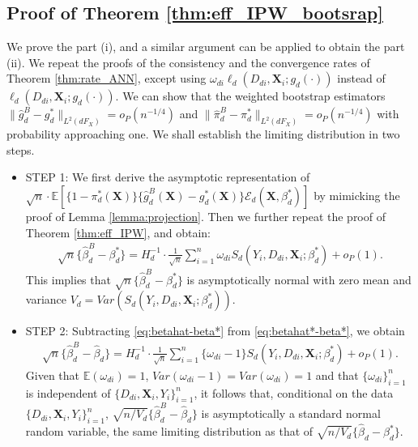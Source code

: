 \documentclass[11pt]{article}
\numberwithin{equation}{section}
\begin{document}
\subsection{Proof of Theorem \ref{thm:eff_IPW_bootsrap}}
We prove the part (i), and a similar argument can be applied to obtain the part (ii). We repeat the proofs of the consistency
and the convergence rates of Theorem \ref{thm:rate_ANN}, except using $\omega_{di}\ell_d(D_{di},\boldsymbol{X}_{i};g_d(\cdot))$
instead of $\ell_d(D_{di},\boldsymbol{X}_{i};g_d(\cdot))$. We can show that
the weighted bootstrap estimators $\|\widehat{g}^{B}_d-{g}_d^*\|_{L^2(dF_X)}=o_P(n^{-1/4})$ and $\|\widehat{\pi}^{B}_d-{\pi}_d^*\|_{L^2(dF_X)}=o_P(n^{-1/4})$   with probability approaching one. We shall establish the limiting
distribution in two steps.
\begin{itemize}
	\item STEP 1: We first derive the asymptotic representation of $\sqrt{n}\cdot\mathbb{E}[\{1-\pi_d^*(\boldsymbol{X})\}\{\widehat{g}^{B}_d(\boldsymbol{X})-g_d^*(\boldsymbol{X})\}\mathcal{E}_d(\boldsymbol{X},\beta_d^*)]$ by mimicking the proof of Lemma \ref{lemma:projection}. Then we further repeat the proof of Theorem \ref{thm:eff_IPW}, and obtain:
	\begin{align}\label{eq:betahat*-beta*}
		\sqrt{n}\{\widehat{\beta}^{B}_{d}-\beta^*_{d}\}=H_d^{-1}\cdot \frac{1}{\sqrt{n}}\sum_{i=1}^n\omega_{di}S_{d}(Y_i,D_{di},\boldsymbol{X}_{i};\beta_d^*)+o_P(1).
	\end{align}
	This implies that $\sqrt{n}\{\widehat{\beta}^{B}_{d}-\beta^*_{d}\}$ is asymptotically
	normal with zero mean and variance $V_d=Var(S_{d}(Y_i,D_{di},\boldsymbol{X}_{i};\beta_d^*))$.
	\item STEP 2: Subtracting \eqref{eq:betahat-beta*} from \eqref{eq:betahat*-beta*}, we obtain
	\begin{align*}
		\sqrt{n}\{\widehat{\beta}^{B}_{d}-\widehat{\beta}_{d}\}=H_d^{-1}\cdot \frac{1}{\sqrt{n}}\sum_{i=1}^n\{\omega_{di}-1\}S_{d}(Y_i,D_{di},\boldsymbol{X}_{i};\beta_d^*)+o_P(1).
	\end{align*}
	Given that $\mathbb{E}(\omega_{di})=1$, $Var(\omega_{di}-1)=Var(\omega_{di})=1$ and that $\{\omega_{di}\}_{i=1}^n$ is independent of $\{D_{di},\boldsymbol{X}_{i},Y_i\}_{i=1}^n$, it follows that, conditional on the data $\{D_{di},\boldsymbol{X}_{i},Y_i\}_{i=1}^n$, $\sqrt{n/V_{d}}\{\widehat{\beta}^{B}_{d}-\widehat{\beta}_{d}\}$ is asymptotically a standard normal random variable, the same limiting distribution as that of $\sqrt{n/V_{d}}\{\widehat{\beta}_{d}-{\beta}^*_{d}\}$.
\end{itemize}
\end{document}
